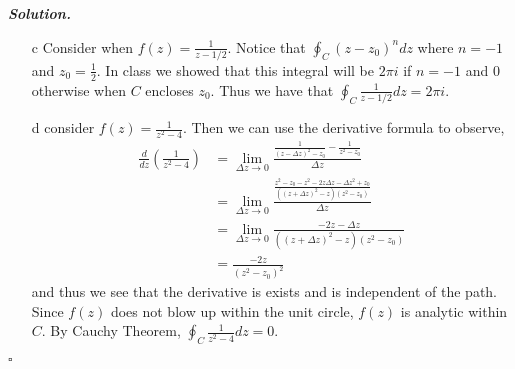 \documentclass[12pt]{report}
\newenvironment{solution}[1][\it{Solution}]{\textbf{#1. } }{$\square$}
\begin{document}
\begin{solution}
\begin{enumerate}
        \item [c]
        Consider when $f(z) = \frac{1}{z - 1/2}$. Notice that $\oint_{C} (z - z_0)^n dz$ where $n=-1$ and $z_0 = \frac{1}{2}$. In class we showed that this integral will be $2\pi i$ if $n=-1$ and $0$ otherwise when $C$ encloses $z_0$. Thus we have that $\boxed{\oint_{C} \frac{1}{z - 1/2} dz = 2\pi i}$.

        \item[d]
        consider $f(z) = \frac{1}{z^2 - 4}$. Then we can use the derivative formula to observe,
        \begin{align*}
            \frac{d}{dz}\left( \frac{1}{z^2 - 4} \right) &= \lim_{\Delta z \rightarrow 0} \frac{\frac{1}{(z - \Delta z)^2 -z_0} - \frac{1}{z^2 - z_0}}{\Delta z}\\
            &= \lim_{\Delta z \rightarrow 0} \frac{\frac{z^2 - z_0 - z^2 -2z\Delta z - \Delta z^2 + z_0}{((z + \Delta z)^2 - z)(z^2 - z_0)}}{\Delta z}\\
            &= \lim_{\Delta z \rightarrow 0} \frac{-2z - \Delta z}{((z + \Delta z)^2 - z)(z^2 - z_0)}\\
            &= \frac{-2z}{(z^2 - z_0)^2}
        \end{align*}
        and thus we see that the derivative is exists and is independent of the path. Since $f(z)$ does not blow up within the unit circle, $f(z)$ is analytic within $C$. By Cauchy Theorem, $\boxed{\oint_C \frac{1}{z^2 - 4} dz = 0}$.


\end{enumerate}
\end{solution}
\end{document}
